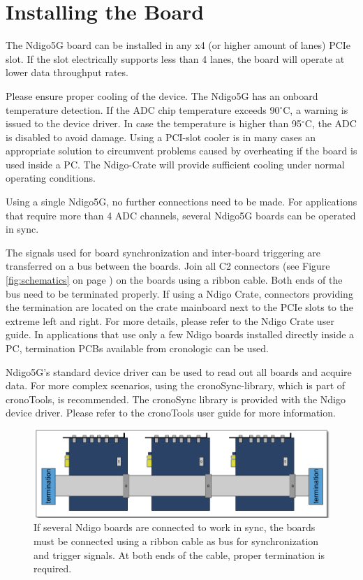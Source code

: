 \section{Installing the Board}
%
The Ndigo5G board can be installed in any x4 (or higher amount of lanes) PCIe slot. If the slot electrically supports less than 4 lanes, the board will operate at lower data throughput rates.\par
Please ensure proper cooling of the device. The Ndigo5G has an onboard temperature detection. If the ADC chip temperature exceeds 90$^{\circ}$C, a warning is issued to the device driver. In case the temperature is higher than 95$^{\circ}$C, the ADC is disabled to avoid damage. Using a PCI-slot cooler is in many cases an appropriate solution to circumvent problems caused by overheating if the board is used inside a PC. The Ndigo-Crate will provide sufficient cooling under normal operating conditions.\par

Using a single Ndigo5G, no further connections need to be made. For applications that require more than 4 ADC channels, several Ndigo5G boards can be operated in sync.\par

The signals used for board synchronization and inter-board triggering are transferred on a bus between the boards. Join all C2 connectors (see Figure \ref{fig:schematics} on page \pageref{fig:schematics}) on the boards using a ribbon cable. Both ends of the bus need to be terminated properly. If using a Ndigo Crate, connectors providing the termination are located on the crate mainboard next to the PCIe slots to the extreme left and right. For more details, please refer to the Ndigo Crate user guide. In applications that use only a few Ndigo boards installed directly inside a PC, termination PCBs available from cronologic can be used.\par
Ndigo5G's standard device driver can be used to read out all boards and acquire data. For more complex scenarios, using the cronoSync-library, which is part of cronoTools, is recommended. The cronoSync library is provided with the Ndigo device driver. Please refer to the cronoTools user guide for more information.
%
\begin{figure}[ht]
    \centering
    \includegraphics[width=\textwidth]{figures/Ndigo_Intercon.pdf}
    \caption{If several Ndigo boards are connected to work in sync, the boards must be connected using a ribbon cable as bus for synchronization and trigger signals. At both ends of the cable, proper termination is required.}
\end{figure}
%
%
%
%
%
\clearpage
